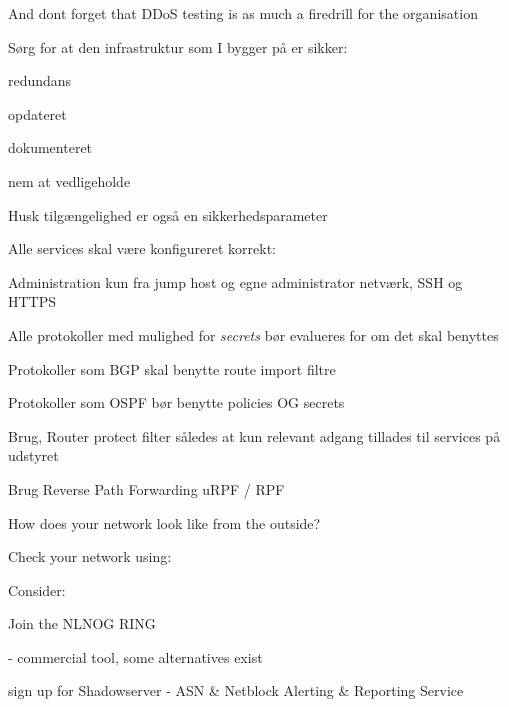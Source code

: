 \documentclass[Screen16to9,17pt]{foils}
\begin{document}
\vskip 3cm
\centerline{And dont forget that DDoS testing is as much a firedrill for the organisation}



\begin{list1}
\item Sørg for at den infrastruktur som I bygger på er sikker:
\begin{list2}
 \item redundans
       \item opdateret
        \item dokumenteret
        \item nem at vedligeholde
\end{list2}

\item  Husk tilgængelighed er også en sikkerhedsparameter
\end{list1}



\begin{list1}
\item Alle services skal være konfigureret korrekt:
\begin{list2}
\item Administration kun fra jump host og egne administrator netværk, SSH og HTTPS
\item Alle protokoller med mulighed for \emph{secrets} bør evalueres for om det skal benyttes
\item Protokoller som BGP skal benytte route import filtre
\item Protokoller som OSPF bør benytte policies OG secrets
\item Brug, Router protect filter således at kun relevant adgang tillades til services på udstyret
\item Brug Reverse Path Forwarding uRPF / RPF
\end{list2}
\end{list1}




\begin{list1}
\item How does your network look like from the outside?
\item Check your network using:
\item {}
\item Consider:
\begin{list2}
  \item Join the NLNOG RING 
\item {} - commercial tool, some alternatives exist
\item {} sign up for Shadowserver - ASN \& Netblock Alerting \& Reporting Service
\end{list2}
\end{list1}
\end{document}
